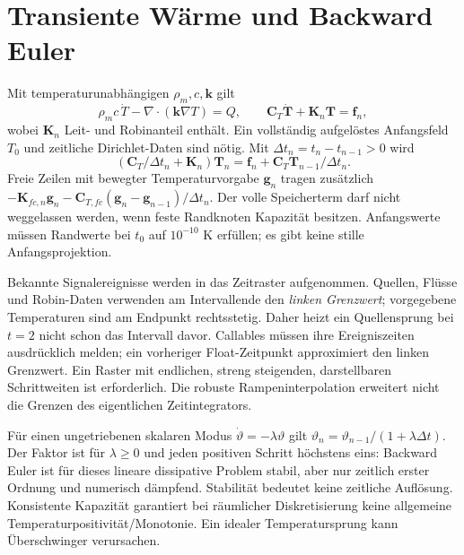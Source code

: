 \section{Transiente Wärme und Backward Euler}
Mit temperaturunabhängigen $\rho_m,c,\mathbf k$ gilt
\begin{equation}\label{eq:heat-time}
\rho_mc\,\dot T-\nabla\cdot(\mathbf k\nabla T)=Q,
\qquad\mathbf C_T\dot{\mathbf T}+\mathbf K_n\mathbf T=\mathbf f_n,
\end{equation}
wobei $\mathbf K_n$ Leit- und Robinanteil enthält. Ein vollständig aufgelöstes
Anfangsfeld $T_0$ und zeitliche Dirichlet-Daten sind nötig. Mit
$\Delta t_n=t_n-t_{n-1}>0$ wird
\begin{equation}\label{eq:backward-euler}
(\mathbf C_T/\Delta t_n+\mathbf K_n)\mathbf T_n
=\mathbf f_n+\mathbf C_T\mathbf T_{n-1}/\Delta t_n.
\end{equation}
Freie Zeilen mit bewegter Temperaturvorgabe $\mathbf g_n$ tragen zusätzlich
$-\mathbf K_{fc,n}\mathbf g_n-
\mathbf C_{T,fc}(\mathbf g_n-\mathbf g_{n-1})/\Delta t_n$.
Der volle Speicherterm darf nicht weggelassen werden, wenn feste Randknoten
Kapazität besitzen. Anfangswerte müssen Randwerte bei $t_0$ auf $10^{-10}$ K
erfüllen; es gibt keine stille Anfangsprojektion.

Bekannte Signalereignisse werden in das Zeitraster aufgenommen. Quellen,
Flüsse und Robin-Daten verwenden am Intervallende den \emph{linken Grenzwert};
vorgegebene Temperaturen sind am Endpunkt rechtsstetig. Daher heizt ein
Quellensprung bei $t=2$ nicht schon das Intervall davor.
Callables müssen ihre Ereigniszeiten ausdrücklich melden; ein vorheriger
Float-Zeitpunkt approximiert den linken Grenzwert. Ein Raster mit endlichen,
streng steigenden, darstellbaren Schrittweiten ist erforderlich. Die robuste
Rampeninterpolation erweitert nicht die Grenzen des eigentlichen Zeitintegrators.

Für einen ungetriebenen skalaren Modus $\dot\vartheta=-\lambda\vartheta$ gilt
$\vartheta_n=\vartheta_{n-1}/(1+\lambda\Delta t)$.
Der Faktor ist für $\lambda\ge0$ und jeden positiven Schritt höchstens eins:
Backward Euler ist für dieses lineare dissipative Problem stabil, aber nur
zeitlich erster Ordnung und numerisch dämpfend. Stabilität bedeutet keine
zeitliche Auflösung. Konsistente Kapazität garantiert bei räumlicher
Diskretisierung keine allgemeine Temperaturpositivität/Monotonie.
Ein idealer Temperatursprung kann Überschwinger verursachen.

